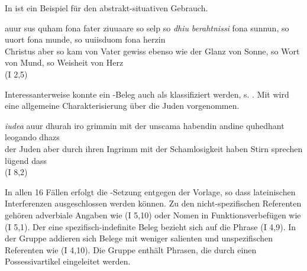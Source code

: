 In  ist ein Beispiel für den abstrakt-situativen Gebrauch. 
%
\begin{exe}
\ex \label{ex:I683}  {auur} {sus} {quham} {fona} {fater} {ziuuaare} {so selp so} {\textit{dhiu}} {\textit{berahtnissi}} {fona} {sunnun}, {so} {uuort} {fona} {munde}, {so} {uuiisduom} {fona} {herzin} \\
{Christus} {aber} {so} {kam} {von} {Vater} {gewiss} {ebenso wie} {der} {Glanz} {von} {Sonne}, {so} {Wort} {von} {Mund}, {so} {Weisheit} {von} {Herz} {}\\
\glt {} (I 2,5)
\end{exe}

Interessanterweise konnte ein -Beleg auch als  klassifiziert werden, s. . Mit  wird eine allgemeine Charakterisierung über die Juden vorgenommen. 
%

\begin{exe}
\ex \label{ex:I4768}  {\textit{iudea}} {auur} {dhurah} {iro} {grimmin} {mit} {der} {unscama} {habendin} {andine} {quhedhant} {leogando} {dhazs}\\
{der} {Juden} {aber} {durch} {ihren} {Ingrimm} {mit} {der} {Schamlosigkeit} {haben} {Stirn} {sprechen} {lügend} {dass}\\
\glt {}(I 8,2)
\end{exe}

In allen 16 Fällen erfolgt die -Setzung entgegen der Vorlage, so dass lateinischen Interferenzen ausgeschlossen werden können. Zu den nicht-spezifischen Referenten gehören adverbiale Angaben wie  (I 5,10) oder Nomen in Funktionsverbefügen wie   (I 5,1). Der eine spezifisch-indefinite Beleg bezieht sich auf die Phrase   (I 4,9). In der Gruppe  addieren sich Belege mit weniger salienten und unspezifischen Referenten wie   (I 4,10). Die Gruppe  enthält Phrasen, die durch einen Possessivartikel eingeleitet werden. 


